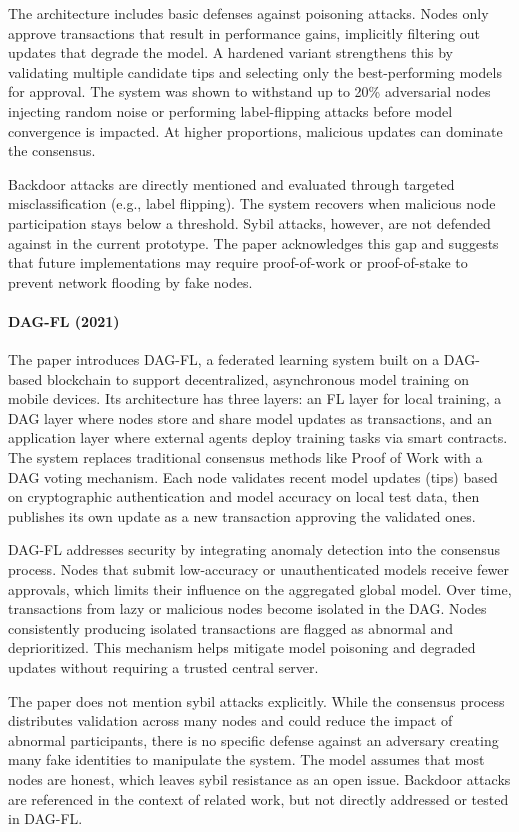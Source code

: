The architecture includes basic defenses against poisoning attacks. Nodes only approve transactions that result in performance gains, implicitly filtering out updates that degrade the model. A hardened variant strengthens this by validating multiple candidate tips and selecting only the best-performing models for approval. The system was shown to withstand up to 20\% adversarial nodes injecting random noise or performing label-flipping attacks before model convergence is impacted. At higher proportions, malicious updates can dominate the consensus.

Backdoor attacks are directly mentioned and evaluated through targeted misclassification (e.g., label flipping). The system recovers when malicious node participation stays below a threshold. Sybil attacks, however, are not defended against in the current prototype. The paper acknowledges this gap and suggests that future implementations may require proof-of-work or proof-of-stake to prevent network flooding by fake nodes.

\newpage
\paragraph{DAG-FL (2021)} \cite{cao_dag-fl_2021}
The paper introduces DAG-FL, a federated learning system built on a DAG-based blockchain to support decentralized, asynchronous model training on mobile devices. Its architecture has three layers: an FL layer for local training, a DAG layer where nodes store and share model updates as transactions, and an application layer where external agents deploy training tasks via smart contracts. The system replaces traditional consensus methods like Proof of Work with a DAG voting mechanism. Each node validates recent model updates (tips) based on cryptographic authentication and model accuracy on local test data, then publishes its own update as a new transaction approving the validated ones.

DAG-FL addresses security by integrating anomaly detection into the consensus process. Nodes that submit low-accuracy or unauthenticated models receive fewer approvals, which limits their influence on the aggregated global model. Over time, transactions from lazy or malicious nodes become isolated in the DAG. Nodes consistently producing isolated transactions are flagged as abnormal and deprioritized. This mechanism helps mitigate model poisoning and degraded updates without requiring a trusted central server.

The paper does not mention sybil attacks explicitly. While the consensus process distributes validation across many nodes and could reduce the impact of abnormal participants, there is no specific defense against an adversary creating many fake identities to manipulate the system. The model assumes that most nodes are honest, which leaves sybil resistance as an open issue. Backdoor attacks are referenced in the context of related work, but not directly addressed or tested in DAG-FL.

